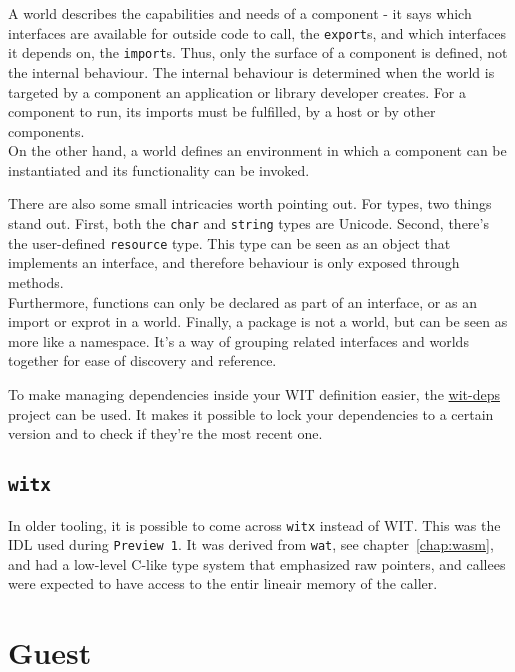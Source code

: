 A world describes the capabilities and needs of a component - it says which interfaces are available for outside code to call, the \texttt{export}s, and which interfaces it depends on, the \texttt{import}s. Thus, only the surface of a component is defined, not the internal behaviour. The internal behaviour is determined when the world is targeted by a component an application or library developer creates. For a component to run, its imports must be fulfilled, by a host or by other components. \\
On the other hand, a world defines an environment in which a component can be instantiated and its functionality can be invoked.

There are also some small intricacies worth pointing out. For types, two things stand out. First, both the \texttt{char} and \texttt{string} types are Unicode. Second, there's the user-defined \texttt{resource} type. This type can be seen as an object that implements an interface, and therefore behaviour is only exposed through methods. \\
Furthermore, functions can only be declared as part of an interface, or as an import or exprot in a world. Finally, a package is not a world, but can be seen as more like a namespace. It's a way of grouping related interfaces and worlds together for ease of discovery and reference.


To make managing dependencies inside your \gls{WIT} definition easier, the \href{https://github.com/bytecodealliance/wit-deps}{wit-deps} project can be used. It makes it possible to lock your dependencies to a certain version and to check if they're the most recent one.

\subsection{\texttt{witx}}

In older tooling, it is possible to come across \texttt{witx} instead of \gls{WIT}. This was the \gls{IDL} used during \texttt{Preview 1}. It was derived from \texttt{wat}, see chapter~\ref{chap:wasm}, and had a low-level C-like type system that emphasized raw pointers, and callees were expected to have access to the entir lineair memory of the caller.
 
\section{Guest}
\label{sec:guest}

